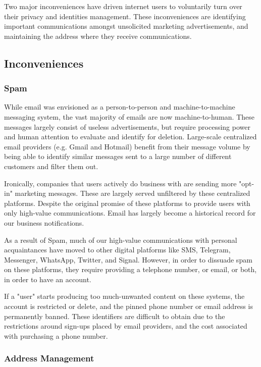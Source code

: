 \documentclass{article}
\theoremstyle{definition}
\begin{document}
Two major inconveniences have driven internet users to voluntarily turn over their privacy and identities management. These inconveniences are identifying important communications amongst unsolicited marketing advertisements, and maintaining the address where they receive communications.

\subsection{Inconveniences}

\subsubsection{Spam}

While email was envisioned as a person-to-person and machine-to-machine messaging system, the vast majority of emails are now machine-to-human. These messages largely consist of useless advertisements, but require processing power and human attention to evaluate and identify for deletion. Large-scale centralized email providers (e.g. Gmail and Hotmail) benefit from their message volume by being able to identify similar messages sent to a large number of different customers and filter them out.

Ironically, companies that users actively do business with are sending more "opt-in" marketing messages. These are largely served unfiltered by these centralized platforms. Despite the original promise of these platforms to provide users with only high-value communications. Email has largely become a historical record for our business notifications.

As a result of Spam, much of our high-value communications with personal acquaintances have moved to other digital platforms like SMS, Telegram, Messenger, WhatsApp, Twitter, and Signal. However, in order to dissuade spam on these platforms, they require providing a telephone number, or email, or both, in order to have an account.

If a "user" starts producing too much-unwanted content on these systems, the account is restricted or delete, and the pinned phone number or email address is permanently banned. These identifiers are difficult to obtain due to the restrictions around sign-ups placed by email providers, and the cost associated with purchasing a phone number.

\subsubsection{Address Management}
\end{document}
